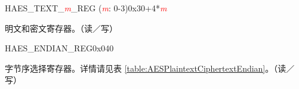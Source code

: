 \begin{register}{H}{AES\_TEXT\_\textcolor{red}{\it{m}}\_REG (\textcolor{red}{\it{m}}: 0-3)}{0x30+4*\textcolor{red}{\it{m}}}\label{regdesc:AESTEXTnREG}
%
\regnewline%
\begin{regdesc}\begin{reglist}
\item [AES\_TEXT\_\textcolor{red}{\it{m}}\_REG (\textcolor{red}{\it{m}}: 0-3)] 明文和密文寄存器。（读／写）
\end{reglist}\end{regdesc}
\end{register}


\begin{register}{H}{AES\_ENDIAN\_REG}{0x040}\label{regdesc:AESENDIANREG}
%
%
\regnewline%
\begin{regdesc}\begin{reglist}
\item [AES\_ENDIAN] 字节序选择寄存器。详情请见表 \ref{table:AESPlaintextCiphertextEndian}。（读／写）
\end{reglist}\end{regdesc}
\end{register}
